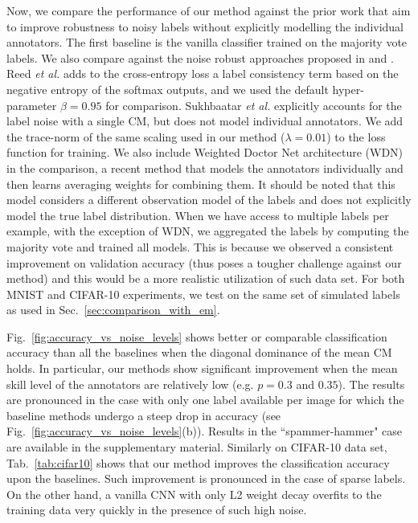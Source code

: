 \label{sec:other_baselines}
Now, we compare the performance of our method against the prior work that aim to improve robustness to noisy labels without explicitly modelling the individual annotators. The first baseline is the vanilla classifier trained on the majority vote labels. We also compare against the noise robust approaches proposed in \cite{reed2014training} and \cite{sukhbaatar2014training}. Reed \textit{et al.} \cite{reed2014training} adds to the cross-entropy loss a label consistency term based on the negative entropy of the softmax outputs, and we used the default hyper-parameter $\beta = 0.95$ for comparison. Sukhbaatar \textit{et al.} \cite{sukhbaatar2014training} explicitly accounts for the label noise with a single CM, but does not model individual annotators. We add the trace-norm of the same scaling used in our method ($\lambda=0.01$) to the loss function for training. We also include Weighted Doctor Net architecture (WDN) \cite{guan2017said} in the comparison, a recent method that models the annotators individually and then learns averaging weights for combining them. It should be noted that this model considers a different observation model of the labels and does not explicitly model the true label distribution. When we have access to multiple labels per example, with the exception of WDN, we aggregated the labels by computing the majority vote and trained all models. This is because we observed a consistent improvement on validation accuracy (thus poses a tougher challenge against our method) and this would be a more realistic utilization of such data set. For both MNIST and CIFAR-10 experiments, we test on the same set of simulated labels as used in Sec.~\ref{sec:comparison_with_em}. 


Fig.~\ref{fig:accuracy_vs_noise_levels} shows better or comparable classification accuracy than all the baselines when the diagonal dominance of the mean CM holds. In particular, our methods show significant improvement when the mean skill level of the annotators are relatively low (e.g. $p=0.3$ and $0.35$). The results are pronounced in the case with only one label available per image for which the baseline methods undergo a steep drop in accuracy (see Fig.~\ref{fig:accuracy_vs_noise_levels}(b)). Results in the ``spammer-hammer" case are available in the supplementary material. Similarly on CIFAR-10 data set, Tab.~\ref{tab:cifar10} shows that our method improves the classification accuracy upon the baselines. Such improvement is pronounced in the case of sparse labels. On the other hand, a vanilla CNN with only L2 weight decay overfits to the training data very quickly in the presence of such high noise. 




